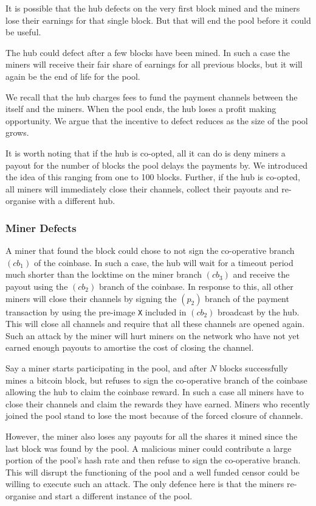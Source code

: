 \documentclass{article}
\begin{document}
It is possible that the hub defects on the very first block mined and
the miners lose their earnings for that single block. But that will
end the pool before it could be useful.

The hub could defect after a few blocks have been mined. In such a
case the miners will receive their fair share of earnings for all
previous blocks, but it will again be the end of life for the pool.

We recall that the hub charges fees to fund the payment channels
between the itself and the miners. When the pool ends, the hub loses a
profit making opportunity. We argue that the incentive to defect
reduces as the size of the pool grows.

It is worth noting that if the hub is co-opted, all it can do is deny
miners a payout for the number of blocks the pool delays the payments
by. We introduced the idea of this ranging from one to 100
blocks. Further, if the hub is co-opted, all miners will immediately
close their channels, collect their payouts and re-organise with a
different hub.

\subsubsection{Miner Defects}\label{ref:miner-defects}

A miner that found the block could chose to not sign the co-operative
branch $(cb_1)$ of the coinbase. In such a case, the hub will wait for
a timeout period much shorter than the locktime on the miner branch
$(cb_3)$ and receive the payout using the $(cb_2)$ branch of the
coinbase. In response to this, all other miners will close their
channels by signing the $(p_2)$ branch of the payment transaction by
using the pre-image \verb|X| included in $(cb_2)$ broadcast by the
hub. This will close all channels and require that all these channels
are opened again. Such an attack by the miner will hurt miners on the
network who have not yet earned enough payouts to amortise the cost of
closing the channel.

Say a miner starts participating in the pool, and after $N$ blocks
successfully mines a bitcoin block, but refuses to sign the
co-operative branch of the coinbase allowing the hub to claim the
coinbase reward. In such a case all miners have to close their
channels and claim the rewards they have earned. Miners who recently
joined the pool stand to lose the most because of the forced closure
of channels.

However, the miner also loses any payouts for all the shares it mined
since the last block was found by the pool. A malicious miner could
contribute a large portion of the pool's hash rate and then refuse to
sign the co-operative branch. This will disrupt the functioning of the
pool and a well funded censor could be willing to execute such an
attack. The only defence here is that the miners re-organise and start
a different instance of the pool.
\end{document}
